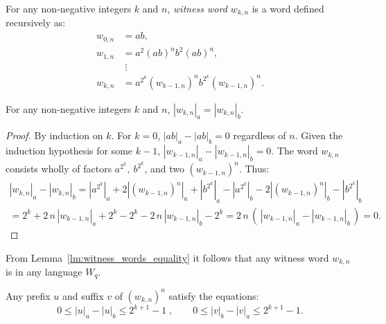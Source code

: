 \begin{defn}
    For any non-negative integers $k$ and $n$, \emph{witness word $w_{k,n}$} is a word defined recursively as:
    \begin{align*}
        w_{0,n} &= ab,\\
        w_{1,n} &= a^2 {(ab)}^n b^2 {(ab)}^n,\\
                &\; \vdots \\
        w_{k,n} &= a^{2^k} {(w_{k-1,n})}^n b^{2^k} {(w_{k-1,n})}^n.
    \end{align*}
\end{defn}

\begin{lemma}\label{lm:witness_words_equality}
    For any non-negative integers $k$ and $n$, $|w_{k,n}|_a = |w_{k,n}|_b$.
\end{lemma}

\begin{proof}
    By induction on $k$. For $k = 0$, $|ab|_a - |ab|_b = 0$ regardless of $n$. Given the induction hypothesis for some $k - 1$, $|w_{k-1,n}|_a - |w_{k-1,n}|_b = 0$. The word $w_{k,n}$ consists wholly of factors $a^{2^k}, \: b^{2^k}$, and two ${(w_{k-1,n})}^n$. Thus:
    \begin{multline*}
        |w_{k,n}|_a - |w_{k,n}|_b = |a^{2^k}|_a + 2|{(w_{k-1,n})}^n|_a + |b^{2^k}|_a - |a^{2^k}|_b - 2|{(w_{k-1,n})}^n|_b - |b^{2^k}|_b \\
        = 2^k + 2 \, n \, |w_{k-1,n}|_a + 2^k - 2^k - 2 \, n \, |w_{k-1,n}|_b - 2^k = 2 \, n \, ( \, |w_{k-1,n}|_a - |w_{k-1,n}|_b \, ) = 0.
    \end{multline*}
\end{proof}

From Lemma~\ref*{lm:witness_words_equality} it follows that any witness word $w_{k,n}$ is in any language $W_q$.

\begin{lemma}\label{lm:witness_words_inequalities}
    Any prefix $u$ and suffix $v$ of ${(w_{k,n})}^n$ satisfy the equations:
    \[
        0 \leq |u|_a - |u|_b \leq 2^{k+1}-1 \; , \qquad 0 \leq |v|_b - |v|_a \leq 2^{k+1}-1.
    \]
\end{lemma}

